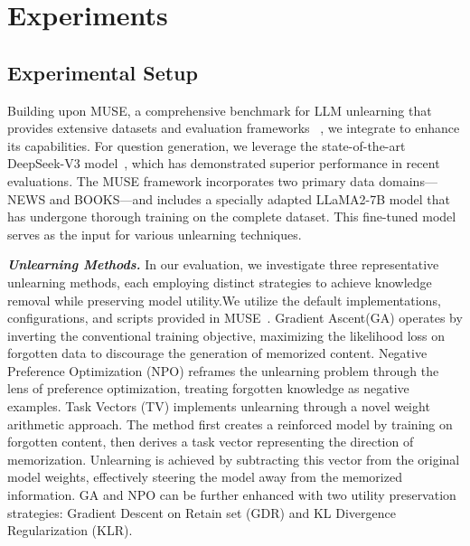 \section{Experiments}
\label{sec:exp}

\subsection{Experimental Setup}
\label{sec:exp_setup}



Building upon MUSE, a comprehensive benchmark for LLM unlearning that provides extensive datasets and evaluation frameworks ~\cite{shi2024muse}, we integrate \sys to enhance its capabilities. For question generation, we leverage the state-of-the-art DeepSeek-V3 model~\cite{liu2024deepseek}, which has demonstrated superior performance in recent evaluations. The MUSE framework incorporates two primary data domains—NEWS and BOOKS—and includes a specially adapted LLaMA2-7B model that has undergone thorough training on the complete dataset. This fine-tuned model serves as the input for various unlearning techniques.

\textit{\textbf{Unlearning Methods.}} In our evaluation, we investigate three representative unlearning methods, each employing distinct strategies to achieve knowledge removal while preserving model utility.We utilize the default implementations, configurations, and scripts provided in MUSE~\cite{shi2024muse}.
Gradient Ascent(GA) operates by inverting the conventional training objective, maximizing the likelihood loss on forgotten data to discourage the generation of memorized content. 
Negative Preference Optimization (NPO) reframes the unlearning problem through the lens of preference optimization, treating forgotten knowledge as negative examples. 
Task Vectors (TV) implements unlearning through a novel weight arithmetic approach. The method first creates a reinforced model by training on forgotten content, then derives a task vector representing the direction of memorization. Unlearning is achieved by subtracting this vector from the original model weights, effectively steering the model away from the memorized information.
GA and NPO can be further enhanced with two utility preservation strategies: Gradient Descent on Retain set (GDR) and KL Divergence Regularization (KLR). 

